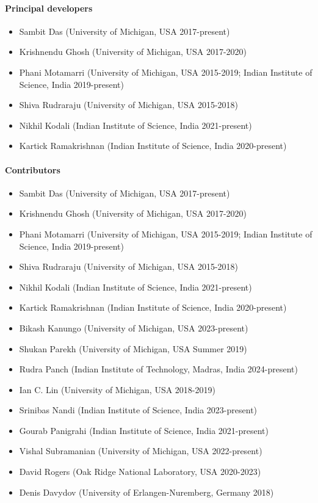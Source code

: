 \paragraph{Principal developers}
\begin{itemize}
	\item Sambit Das (University of Michigan, USA 2017-present)
	\item Krishnendu Ghosh (University of Michigan, USA 2017-2020)    
	\item Phani Motamarri (University of Michigan, USA 2015-2019; Indian Institute of Science, India 2019-present)
	\item Shiva Rudraraju (University of Michigan, USA 2015-2018)
 \item Nikhil Kodali (Indian Institute of Science, India 2021-present)
\item Kartick Ramakrishnan (Indian Institute of Science, India 2020-present)   
\end{itemize}



\paragraph{Contributors}
\begin{itemize}
    \item Sambit Das (University of Michigan, USA 2017-present)
	\item Krishnendu Ghosh (University of Michigan, USA 2017-2020)   
 	\item Phani Motamarri (University of Michigan, USA 2015-2019; Indian Institute of Science, India 2019-present) 
	\item Shiva Rudraraju (University of Michigan, USA 2015-2018)    
 \item Nikhil Kodali (Indian Institute of Science, India 2021-present)
\item Kartick Ramakrishnan (Indian Institute of Science, India 2020-present) 
	\item Bikash Kanungo (University of Michigan, USA 2023-present)
 \item Shukan Parekh (University of Michigan, USA Summer 2019)
 \item Rudra Panch (Indian Institute of Technology, Madras, India 2024-present) 
  \item Ian C. Lin (University of Michigan, USA 2018-2019)
\item Srinibas Nandi (Indian Institute of Science, India 2023-present) 
\item Gourab Panigrahi (Indian Institute of Science, India 2021-present)
  	\item Vishal Subramanian (University of Michigan, USA 2022-present)
\item David Rogers (Oak Ridge National Laboratory, USA 2020-2023)
\item Denis Davydov (University of Erlangen-Nuremberg, Germany 2018)
	
\end{itemize}

